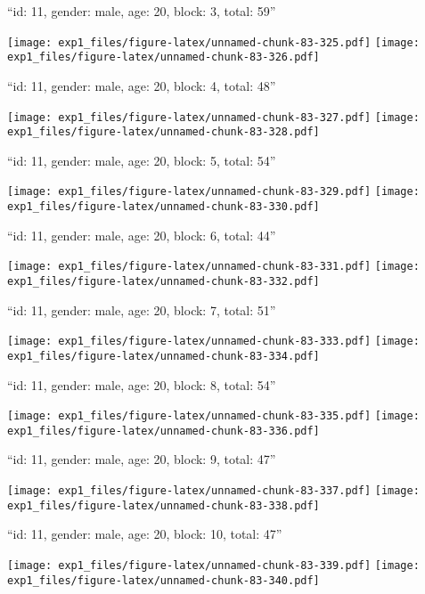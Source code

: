 \documentclass[11pt,,]{article}
\begin{document}
\newpage
[1] 

``id: 11, gender: male, age: 20, block: 3, total: 59''

\texttt{[image: exp1\_files/figure-latex/unnamed-chunk-83-325.pdf]}
\texttt{[image: exp1\_files/figure-latex/unnamed-chunk-83-326.pdf]}

\newpage
[1] 

``id: 11, gender: male, age: 20, block: 4, total: 48''

\texttt{[image: exp1\_files/figure-latex/unnamed-chunk-83-327.pdf]}
\texttt{[image: exp1\_files/figure-latex/unnamed-chunk-83-328.pdf]}

\newpage
[1] 

``id: 11, gender: male, age: 20, block: 5, total: 54''

\texttt{[image: exp1\_files/figure-latex/unnamed-chunk-83-329.pdf]}
\texttt{[image: exp1\_files/figure-latex/unnamed-chunk-83-330.pdf]}

\newpage
[1] 

``id: 11, gender: male, age: 20, block: 6, total: 44''

\texttt{[image: exp1\_files/figure-latex/unnamed-chunk-83-331.pdf]}
\texttt{[image: exp1\_files/figure-latex/unnamed-chunk-83-332.pdf]}

\newpage
[1] 

``id: 11, gender: male, age: 20, block: 7, total: 51''

\texttt{[image: exp1\_files/figure-latex/unnamed-chunk-83-333.pdf]}
\texttt{[image: exp1\_files/figure-latex/unnamed-chunk-83-334.pdf]}

\newpage
[1] 

``id: 11, gender: male, age: 20, block: 8, total: 54''

\texttt{[image: exp1\_files/figure-latex/unnamed-chunk-83-335.pdf]}
\texttt{[image: exp1\_files/figure-latex/unnamed-chunk-83-336.pdf]}

\newpage
[1] 

``id: 11, gender: male, age: 20, block: 9, total: 47''

\texttt{[image: exp1\_files/figure-latex/unnamed-chunk-83-337.pdf]}
\texttt{[image: exp1\_files/figure-latex/unnamed-chunk-83-338.pdf]}

\newpage
[1] 

``id: 11, gender: male, age: 20, block: 10, total: 47''

\texttt{[image: exp1\_files/figure-latex/unnamed-chunk-83-339.pdf]}
\texttt{[image: exp1\_files/figure-latex/unnamed-chunk-83-340.pdf]}
\end{document}
